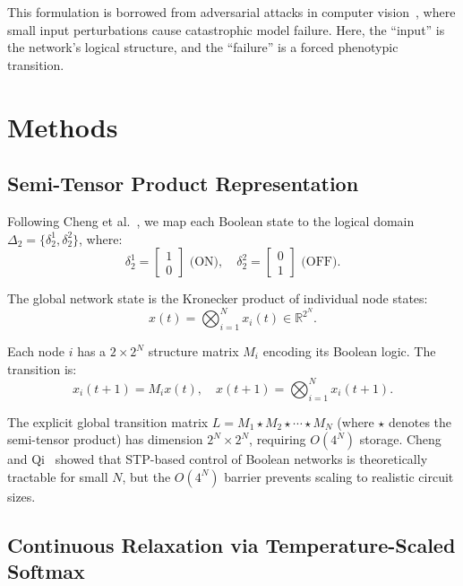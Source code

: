 \documentclass[11pt,a4paper]{article}
\begin{document}
This formulation is borrowed from adversarial attacks in computer vision~\cite{szegedy2014intriguing, madry2018towards}, where small input perturbations cause catastrophic model failure. Here, the ``input'' is the network's logical structure, and the ``failure'' is a forced phenotypic transition.

\section{Methods}
\label{sec:methods}

\subsection{Semi-Tensor Product Representation}
\label{sec:stp_representation}

Following Cheng et al.~\cite{cheng2011analysis}, we map each Boolean state to the logical domain $\Delta_2 = \{\delta_2^1, \delta_2^2\}$, where:
\begin{equation}
\delta_2^1 = \begin{bmatrix} 1 \\ 0 \end{bmatrix} \text{ (ON)}, \quad
\delta_2^2 = \begin{bmatrix} 0 \\ 1 \end{bmatrix} \text{ (OFF)}.
\end{equation}

The global network state is the Kronecker product of individual node states:
\begin{equation}
x(t) = \bigotimes_{i=1}^N x_i(t) \in \mathbb{R}^{2^N}.
\end{equation}

Each node $i$ has a $2 \times 2^N$ structure matrix $M_i$ encoding its Boolean logic. The transition is:
\begin{equation}
x_i(t+1) = M_i x(t), \quad
x(t+1) = \bigotimes_{i=1}^N x_i(t+1).
\end{equation}

The explicit global transition matrix $L = M_1 \star M_2 \star \cdots \star M_N$ (where $\star$ denotes the semi-tensor product) has dimension $2^N \times 2^N$, requiring $O(4^N)$ storage. Cheng and Qi~\cite{cheng2010controllability} showed that STP-based control of Boolean networks is theoretically tractable for small $N$, but the $O(4^N)$ barrier prevents scaling to realistic circuit sizes.

\subsection{Continuous Relaxation via Temperature-Scaled Softmax}
\label{sec:relaxation}
\end{document}
